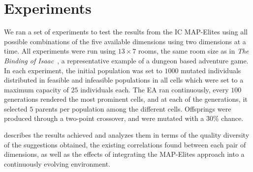 \documentclass[conference]{IEEEtran}
\begin{document}




\section{Experiments}

We ran a set of experiments to test the results from the IC MAP-Elites using all possible combinations of the five available dimensions using two dimensions at a time. All experiments were run using $13\times7$ rooms, the same room size as in \emph{The Binding of Isaac}~\cite{mcmillen_binding_2011}, a representative example of a dungeon based adventure game.
In each experiment, the initial population was set to $1000$ mutated individuals distributed in feasible and infeasible populations in all cells which were set to a maximum capacity of $25$ individuals each. The EA ran continuously, every $100$ generations rendered the most prominent cells, and at each of the generations, it selected $5$ parents per population among the different cells. Offsprings were produced through a two-point crossover, and were mutated with a 30\% chance.  %

 describes the results achieved and analyzes them in terms of the quality diversity of the suggestions obtained, the existing correlations found between each pair of dimensions, as well as the effects of integrating the MAP-Elites approach into a continuously evolving environment.
\end{document}
